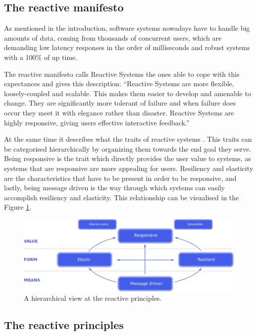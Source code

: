 \documentclass[../main.tex]{subfiles}
\begin{document}
\subsection{The reactive manifesto}

As mentioned in the introduction, software systems nowadays have to handle big amounts of data,
coming from thousands of concurrent users, which are demanding low latency responses in the order of
milliseconds and robust systems with a 100\% of up time.


The reactive manifesto \autocite{2014TheManifesto} calls Reactive Systems the
ones able to cope with this expectances and gives this description: ``Reactive
Systems are more flexible, loosely-coupled and scalable. This makes them easier
to develop and amenable to change. They are significantly more tolerant of
failure and when failure does occur they meet it with elegance rather than
disaster. Reactive Systems are highly responsive, giving users effective
interactive feedback.''

At the same time it describes what the traits of reactive systems . This
traits can be categorised hierarchically by organizing them towards the end goal they serve. Being
responsive is the trait which directly provides the user value to systems, as systems that are responsive
are more appealing for users. Resiliency and elasticity are the characteristics that
have to be present in order to be responsive, and lastly, being message driven is the way
through which systems can easily accomplish resiliency and elasticity. This relationship can be visualised in the Figure
\ref{fig:reactive}.

\begin{figure}[ht] \centering
\includegraphics[width=\textwidth]{images/reactive-traits.png}
    \caption{A hierarchical view at the reactive principles.}
    \label{fig:reactive}
\end{figure}

\subsection{The reactive principles}
\end{document}
